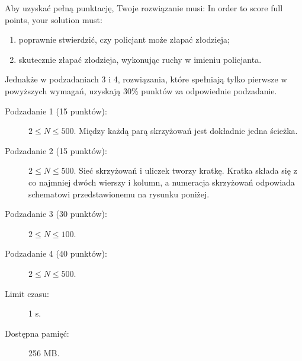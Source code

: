 \documentclass{boi2014-pl}
\begin{document}
    \Scoring
    Aby uzyskać pełną punktację, Twoje rozwiązanie musi:
    In order to score full points, your solution must:
    \begin{enumerate}
      \item poprawnie stwierdzić, czy policjant może złapać złodzieja;
      \item skutecznie złapać złodzieja, wykonując ruchy w imieniu policjanta.
    \end{enumerate}
   
    Jednakże w podzadaniach 3 i 4, rozwiązania, które spełniają tylko pierwsze
    w powyższych wymagań, uzyskają 30\% punktów za odpowiednie podzadanie.

    \begin{description}
        \item[Podzadanie 1 (15 punktów):] $2 \le N \le 500$. Między każdą parą skrzyżowań jest dokładnie jedna ścieżka.
        \item[Podzadanie 2 (15 punktów):] $2 \le N \le 500$. Sieć skrzyżowań i uliczek tworzy kratkę.
        Kratka składa się z co najmniej dwóch wierszy i kolumn, a numeracja skrzyżowań
        odpowiada schematowi przedstawionemu na rysunku poniżej.
        \begin{figure}[h!]
           \centering
        \end{figure}
        \item[Podzadanie 3 (30 punktów):] $2 \le N \le 100$.
        \item[Podzadanie 4 (40 punktów):] $2 \le N \le 500$.
    \end{description}

    \Constraints
    
    \begin{description}
        \item[Limit czasu:] 1 s.
        \item[Dostępna pamięć:] 256 MB.
    \end{description}

\end{document}
